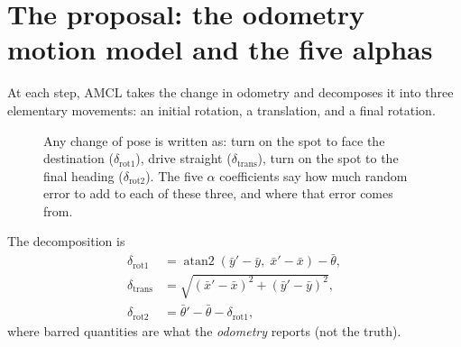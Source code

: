 \documentclass[11pt,a4paper]{report}
\newcommand{\xt}{\mathbf{x}}
\begin{document}
\section{The proposal: the odometry motion model and the five alphas}

At each step, AMCL takes the change in odometry and decomposes it into three
elementary movements: an initial rotation, a translation, and a final
rotation.

\begin{figure}[htbp]
\centering
{}
\caption[Odometry decomposition]{Any change of pose is written as: turn on the
spot to face the destination ($\delta_{\text{rot}1}$), drive straight
($\delta_{\text{trans}}$), turn on the spot to the final heading
($\delta_{\text{rot}2}$). The five $\alpha$ coefficients say how much random
error to add to each of these three, and where that error comes from.}
\label{fig:odomdecomp}
\end{figure}

The decomposition is
\begin{equation}
\begin{aligned}
\delta_{\text{rot}1} &= \operatorname{atan2}(\bar{y}' - \bar{y},\; \bar{x}' - \bar{x}) - \bar\theta, \\
\delta_{\text{trans}} &= \sqrt{(\bar{x}' - \bar{x})^2 + (\bar{y}' - \bar{y})^2}, \\
\delta_{\text{rot}2} &= \bar\theta' - \bar\theta - \delta_{\text{rot}1},
\end{aligned}
\label{eq:odomdelta}
\end{equation}
where barred quantities are what the \emph{odometry} reports (not the truth).
\end{document}
